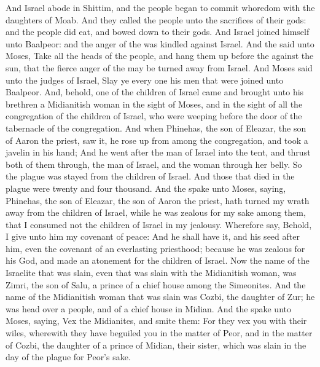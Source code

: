 \begin{biblechapter} %
 And Israel abode in Shittim, and the people began to commit whoredom with the daughters of Moab.
\verse And they called the people unto the sacrifices of their gods: and the people did eat, and bowed down to their gods.
\verse And Israel joined himself unto Baalpeor: and the anger of the \LORD was kindled against Israel.
\verse And the \LORD said unto Moses, Take all the heads of the people, and hang them up before the \LORD against the sun, that the fierce anger of the \LORD may be turned away from Israel.
\verse And Moses said unto the judges of Israel, Slay ye every one his men that were joined unto Baalpeor.
\verse And, behold, one of the children of Israel came and brought unto his brethren a Midianitish woman in the sight of Moses, and in the sight of all the congregation of the children of Israel, who were weeping before the door of the tabernacle of the congregation.
\verse And when Phinehas, the son of Eleazar, the son of Aaron the priest, saw it, he rose up from among the congregation, and took a javelin in his hand;
\verse And he went after the man of Israel into the tent, and thrust both of them through, the man of Israel, and the woman through her belly. So the plague was stayed from the children of Israel.
\verse And those that died in the plague were twenty and four thousand.
\verse And the \LORD spake unto Moses, saying,
\verse Phinehas, the son of Eleazar, the son of Aaron the priest, hath turned my wrath away from the children of Israel, while he was zealous for my sake among them, that I consumed not the children of Israel in my jealousy.
\verse Wherefore say, Behold, I give unto him my covenant of peace:
\verse And he shall have it, and his seed after him, even the covenant of an everlasting priesthood; because he was zealous for his God, and made an atonement for the children of Israel.
\verse Now the name of the Israelite that was slain, even that was slain with the Midianitish woman, was Zimri, the son of Salu, a prince of a chief house among the Simeonites.
\verse And the name of the Midianitish woman that was slain was Cozbi, the daughter of Zur; he was head over a people, and of a chief house in Midian.
\verse And the \LORD spake unto Moses, saying,
\verse Vex the Midianites, and smite them:
\verse For they vex you with their wiles, wherewith they have beguiled you in the matter of Peor, and in the matter of Cozbi, the daughter of a prince of Midian, their sister, which was slain in the day of the plague for Peor's sake.
\end{biblechapter}

